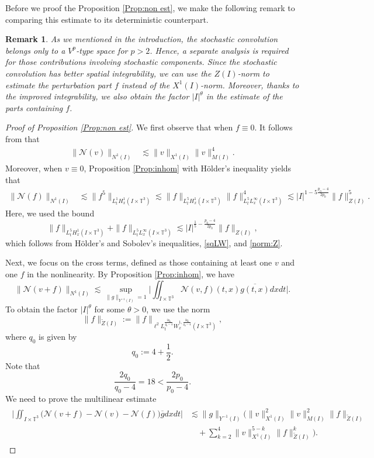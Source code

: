 \documentclass[letterpaper, 11pt,  reqno]{amsart}
\newtheorem{remark}[theorem]{Remark}
\newcommand{\1}{\hspace{0.5mm}\text{I}\hspace{0.5mm}}
\newcommand{\T}{\mathbb{T}}
\newcommand{\wt}{\widetilde}
\newcommand{\cj}{\overline}
\renewcommand{\l}{\ell}
\newcommand{\les}{\lesssim}
\newcommand{\NN}{\mathcal{N}}
\numberwithin{equation}{section}
\numberwithin{theorem}{section}
\begin{document}
Before we proof the Proposition \ref{Prop:non est}, we make the following remark to 
comparing this estimate to its
deterministic counterpart.

\begin{remark}\rm
As we mentioned in the introduction,
the stochastic convolution belongs only
to a $V^p$-type space for $p>2$.
Hence, 
a separate analysis is required for those contributions involving stochastic components.
Since
the stochastic convolution has better spatial integrability,
we can use the $Z(I)$-norm to estimate the perturbation part $f$ instead of the $X^1(I)$-norm.
Moreover,
thanks to the improved integrability,
we also obtain the factor $|I|^\theta$ in the estimate of the parts containing $f$.
\end{remark}

\begin{proof}[Proof of Proposition \ref{Prop:non est}]


We first observe that 
when $f\equiv0$.
It follows from \cite[Lemma 3.2]{IP12} that
\begin{align*}
\big \|
\NN (v)
\big \|_{N^1(I)}
&\les
\|v\|_{X^1(I)} \|v\|^{4}_{M(I)}
.
\end{align*}
Moreover,
when $v\equiv0$,
Proposition \ref{Prop:inhom} with H\"older's inequality yields that
\begin{align*}
\big \|
\NN (f)
\big \|_{N^1(I)}
&\les
\| f^5 \|_{L_t^1 H_x^1 (I \times \T^3)}
\les
\| f \|_{L_t^5 H_x^1 (I \times \T^3)}
\| f \|_{L_t^5 L_x^\infty (I \times \T^3)}^4
\les
|I|^{1- 5\frac{p_0-4}{2p_0}}
\|f\|_{Z(I)}^5.
\end{align*}
Here,
we used the bound
\[
\| f \|_{L_t^5 H_x^1 (I \times \T^3)}
+
\| f \|_{L_t^5 L_x^\infty (I \times \T^3)}
\les
|I|^{\frac 15-\frac{p_0-4}{2p_0}}
\|f\|_{Z(I)},
\]
which follows from H\"older's and Sobolev's inequalities, \eqref{sqLW}, and \eqref{norm:Z}.

Next, we focus on the cross terms, defined as those containing at least one $v$ and one $f$ in the nonlinearity.
By Proposition \ref{Prop:inhom}, we have
\[
    \big\| \NN(v+f) \|_{N^1(I)}
    \lesssim
    \sup_{\|g\|_{Y^{-1} (I)}=1}
    \bigg|  \iint_{I\times\T^3} \mathcal{N}(v,f)(t,x)\overline{g(t,x)}dxdt  \bigg|.
\]
To obtain the factor $|I|^\theta$ for some $\theta>0$,
we use the norm
\[
\|f\|_{\wt Z(I)}
:=
\| f \|_{\l^2 L_t^{\frac{2q_0}{q_0-4}} W_x^{1, \frac{2q_0}{q_0-4}}(I\times\T^3)}
,
\]
where $q_0$ is given by
\begin{equation}
q_0 := 4 + \frac 12.
\label{p0aa}
\end{equation}
Note that
\[
\frac{2q_0}{q_0-4}
= 18
<
\frac{2p_0}{p_0-4}
.
\]
We need to prove the multilinear estimate
\begin{align}
\label{eq:non-est3}
\begin{aligned}
    \bigg|  \iint_{I\times\T^3}
\big(
\NN(v+f)
- \NN(v)
- \NN(f)
\big)
\cj{g}
dxdt  \bigg|
&\les 
\|g\|_{Y^{-1} (I)}
\Big(
\|v\|_{X^1(I)}^2
\|v\|_{M(I)}^2
\|f\|_{\wt Z(I)}
\\
&
\quad
+
\sum_{k=2}^4
\|v\|_{X^1(I)}^{5-k}
\|f\|_{\wt Z(I)}^k
\Big)
.
\end{aligned}
\end{align}


\end{proof}
\end{document}
